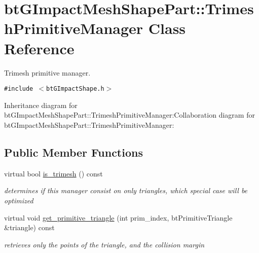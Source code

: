 \hypertarget{classbt_g_impact_mesh_shape_part_1_1_trimesh_primitive_manager}{
\section{btGImpactMeshShapePart::TrimeshPrimitiveManager Class Reference}
\label{classbt_g_impact_mesh_shape_part_1_1_trimesh_primitive_manager}
}
Trimesh primitive manager.  


{\tt \#include $<$btGImpactShape.h$>$}

Inheritance diagram for btGImpactMeshShapePart::TrimeshPrimitiveManager:Collaboration diagram for btGImpactMeshShapePart::TrimeshPrimitiveManager:\subsection*{Public Member Functions}
\begin{CompactItemize}
\item 
\hypertarget{classbt_g_impact_mesh_shape_part_1_1_trimesh_primitive_manager_ada8f4a60842983518401d05c94d1336}{
virtual bool \hyperlink{classbt_g_impact_mesh_shape_part_1_1_trimesh_primitive_manager_ada8f4a60842983518401d05c94d1336}{is\_\-trimesh} () const }
\label{classbt_g_impact_mesh_shape_part_1_1_trimesh_primitive_manager_ada8f4a60842983518401d05c94d1336}

\begin{CompactList}\small\item\em determines if this manager consist on only triangles, which special case will be optimized \item\end{CompactList}\item 
\hypertarget{classbt_g_impact_mesh_shape_part_1_1_trimesh_primitive_manager_f0e4530a36fb1647c83b79eafd7a7415}{
virtual void \hyperlink{classbt_g_impact_mesh_shape_part_1_1_trimesh_primitive_manager_f0e4530a36fb1647c83b79eafd7a7415}{get\_\-primitive\_\-triangle} (int prim\_\-index, btPrimitiveTriangle \&triangle) const }
\label{classbt_g_impact_mesh_shape_part_1_1_trimesh_primitive_manager_f0e4530a36fb1647c83b79eafd7a7415}

\begin{CompactList}\small\item\em retrieves only the points of the triangle, and the collision margin \item\end{CompactList}\end{CompactItemize}


